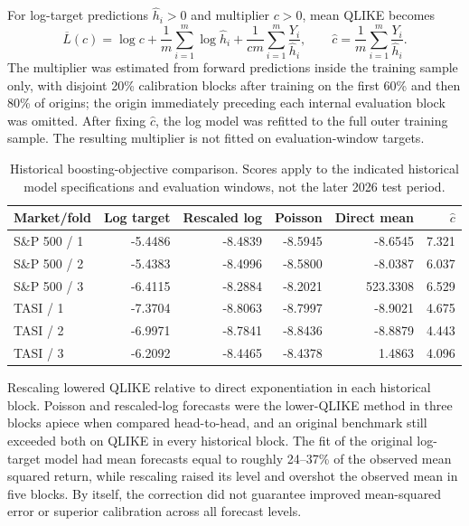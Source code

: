 For log-target predictions $\widehat h_i>0$ and multiplier $c>0$, mean QLIKE becomes
\begin{equation}\label{eq:rescale-optimum}
\overline L(c)=\log c +\frac1m\sum_{i=1}^m\log\widehat h_i+
\frac1{cm}\sum_{i=1}^m\frac{Y_i}{\widehat h_i},
\qquad\widehat c=\frac1m\sum_{i=1}^m\frac{Y_i}{\widehat h_i}.
\end{equation}
The multiplier was estimated from forward predictions inside the training sample only, with disjoint 20\% calibration blocks after training on the first 60\% and then 80\% of origins; the origin immediately preceding each internal evaluation block was omitted. After fixing $\widehat c$, the log model was refitted to the full outer training sample. The resulting multiplier is not fitted on evaluation-window targets.

\begin{table}[ht]\centering\small
\caption{Historical boosting-objective comparison. Scores apply to the indicated historical model specifications and evaluation windows, not the later 2026 test period.}
\begin{tabular}{lrrrrr}\toprule
Market/fold & Log target & Rescaled log & Poisson & Direct mean & $\widehat c$\\\midrule
S\&P 500 / 1 & -5.4486 & -8.4839 & -8.5945 & -8.6545 & 7.321\\
S\&P 500 / 2 & -5.4383 & -8.4996 & -8.5800 & -8.0387 & 6.037\\
S\&P 500 / 3 & -6.4115 & -8.2884 & -8.2021 & 523.3308 & 6.529\\
TASI / 1 & -7.3704 & -8.8063 & -8.7997 & -8.9021 & 4.675\\
TASI / 2 & -6.9971 & -8.7841 & -8.8436 & -8.8879 & 4.443\\
TASI / 3 & -6.2092 & -8.4465 & -8.4378 & 1.4863 & 4.096\\\bottomrule
\end{tabular}\end{table}

Rescaling lowered QLIKE relative to direct exponentiation in each historical block. Poisson and rescaled-log forecasts were the lower-QLIKE method in three blocks apiece when compared head-to-head, and an original benchmark still exceeded both on QLIKE in every historical block. The fit of the original log-target model had mean forecasts equal to roughly 24--37\% of the observed mean squared return, while rescaling raised its level and overshot the observed mean in five blocks. By itself, the correction did not guarantee improved mean-squared error or superior calibration across all forecast levels.

